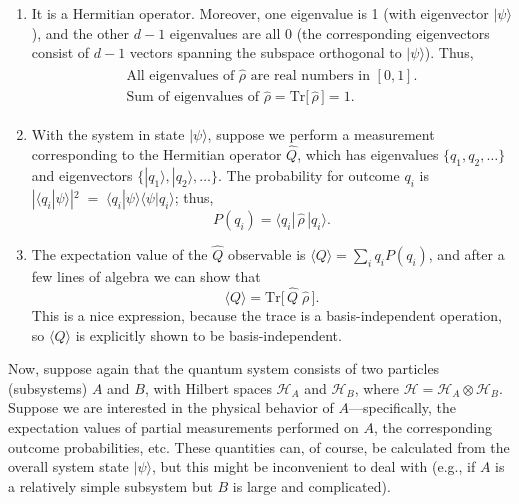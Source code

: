 \documentclass[pra,12pt]{revtex4}
\begin{document}
\begin{enumerate}
\item It is a Hermitian operator.  Moreover, one eigenvalue is 1 (with
  eigenvector $|\psi\rangle$), and the other $d-1$ eigenvalues are all
  $0$ (the corresponding eigenvectors consist of $d-1$ vectors
  spanning the subspace orthogonal to $|\psi\rangle$).  Thus,
\begin{align}
  \begin{aligned}
    \textrm{All eigenvalues of $\hat{\rho}$ are real numbers in $[0,1]$.} \\
    \textrm{Sum of eigenvalues of $\hat{\rho}$} = \mathrm{Tr}\big[\,\hat{\rho} \,\big] = 1.
  \end{aligned}
  \label{trrho}
\end{align}

\item With the system in state $|\psi\rangle$, suppose we perform a
  measurement corresponding to the Hermitian operator $\hat{Q}$, which
  has eigenvalues $\{q_1,q_2,\dots\}$ and eigenvectors
  $\{|q_1\rangle,|q_2\rangle,\dots\}$.  The probability for outcome
  $q_i$ is $|\langle q_i| \psi\rangle|^2 \;=\; \langle q_i
  |\psi\rangle \langle \psi|q_i\rangle$; thus,
  \begin{equation}
    P(q_i) = \langle q_i |\, \hat{\rho}\, |q_i \rangle.
    \label{Pi_rho}
  \end{equation}

\item The expectation value of the $\hat{Q}$ observable is $\langle
  Q\rangle = \sum_i q_i P(q_i)$, and after a few lines of algebra we
  can show that
  \begin{equation}
    \langle Q\rangle = \mathrm{Tr}\big[\,\hat{Q} \; \hat{\rho}\,\big].
    \label{Qexpt}
  \end{equation}
This is a nice expression, because the trace is a basis-independent
operation, so $\langle Q\rangle$ is explicitly shown to be
basis-independent.
\end{enumerate}

Now, suppose again that the quantum system consists of two particles
(subsystems) $A$ and $B$, with Hilbert spaces $\mathscr{H}_A$ and
$\mathscr{H}_B$, where $\mathscr{H} = \mathscr{H}_A \otimes
\mathscr{H}_B$.  Suppose we are interested in the physical behavior of
$A$---specifically, the expectation values of partial measurements
performed on $A$, the corresponding outcome probabilities, etc.  These
quantities can, of course, be calculated from the overall system state
$|\psi\rangle$, but this might be inconvenient to deal with (e.g., if
$A$ is a relatively simple subsystem but $B$ is large and
complicated).
\end{document}
